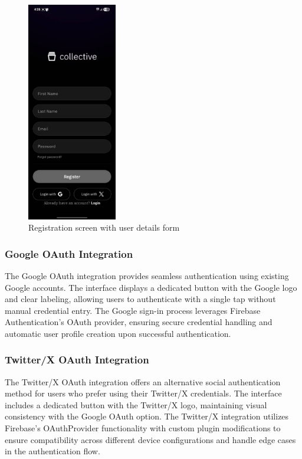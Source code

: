\begin{figure}[H]
\centering
\includegraphics[width=0.35\textwidth]{files/imgs/prototype/auth_register.jpeg}
\caption{Registration screen with user details form}
\label{fig:registration-screen}
\end{figure}

\subsubsection{Google OAuth Integration}

The Google OAuth integration provides seamless authentication using existing Google accounts. The interface displays a dedicated button with the Google logo and clear labeling, allowing users to authenticate with a single tap without manual credential entry. The Google sign-in process leverages Firebase Authentication's OAuth provider, ensuring secure credential handling and automatic user profile creation upon successful authentication.

\subsubsection{Twitter/X OAuth Integration}

The Twitter/X OAuth integration offers an alternative social authentication method for users who prefer using their Twitter/X credentials. The interface includes a dedicated button with the Twitter/X logo, maintaining visual consistency with the Google OAuth option. The Twitter/X integration utilizes Firebase's OAuthProvider functionality with custom plugin modifications to ensure compatibility across different device configurations and handle edge cases in the authentication flow.

